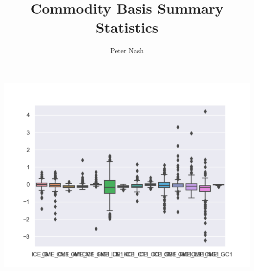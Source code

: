 \documentclass[10pt,a4paper]{article}
\author{Peter Nash}
\title{Commodity Basis Summary Statistics}
\begin{document}

\includegraphics{CYDistribution}

\end{document}
